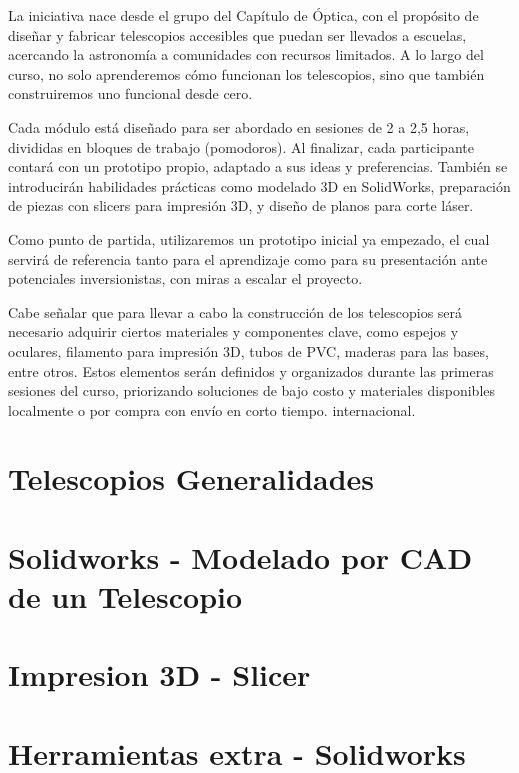 \documentclass[12pt, twoside]{book}
\begin{document}
	La iniciativa nace desde el grupo del Capítulo de Óptica, con el propósito de diseñar y fabricar telescopios accesibles que puedan ser llevados a escuelas, acercando la astronomía a comunidades con recursos limitados. A lo largo del curso, no solo aprenderemos cómo funcionan los telescopios, sino que también construiremos uno funcional desde cero.
	
	Cada módulo está diseñado para ser abordado en sesiones de 2 a 2,5 horas, divididas en bloques de trabajo (pomodoros). Al finalizar, cada participante contará con un prototipo propio, adaptado a sus ideas y preferencias. También se introducirán habilidades prácticas como modelado 3D en SolidWorks, preparación de piezas con slicers para impresión 3D, y diseño de planos para corte láser.
	
	Como punto de partida, utilizaremos un prototipo inicial ya empezado, el cual servirá de referencia tanto para el aprendizaje como para su presentación ante potenciales inversionistas, con miras a escalar el proyecto.
	
	Cabe señalar que para llevar a cabo la construcción de los telescopios será necesario adquirir ciertos materiales y componentes clave, como espejos y oculares, filamento para impresión 3D, tubos de PVC, maderas para las bases, entre otros. Estos elementos serán definidos y organizados durante las primeras sesiones del curso, priorizando soluciones de bajo costo y materiales disponibles localmente o por compra con envío en corto tiempo. internacional. 
	
	
	\chapter{Telescopios Generalidades}
	\label{telescopes_general}
	
	
	\chapter{Solidworks - Modelado por CAD de un Telescopio}
	
	\chapter{Impresion 3D - Slicer}
	
	\chapter{Herramientas extra - Solidworks}
	
\end{document}
